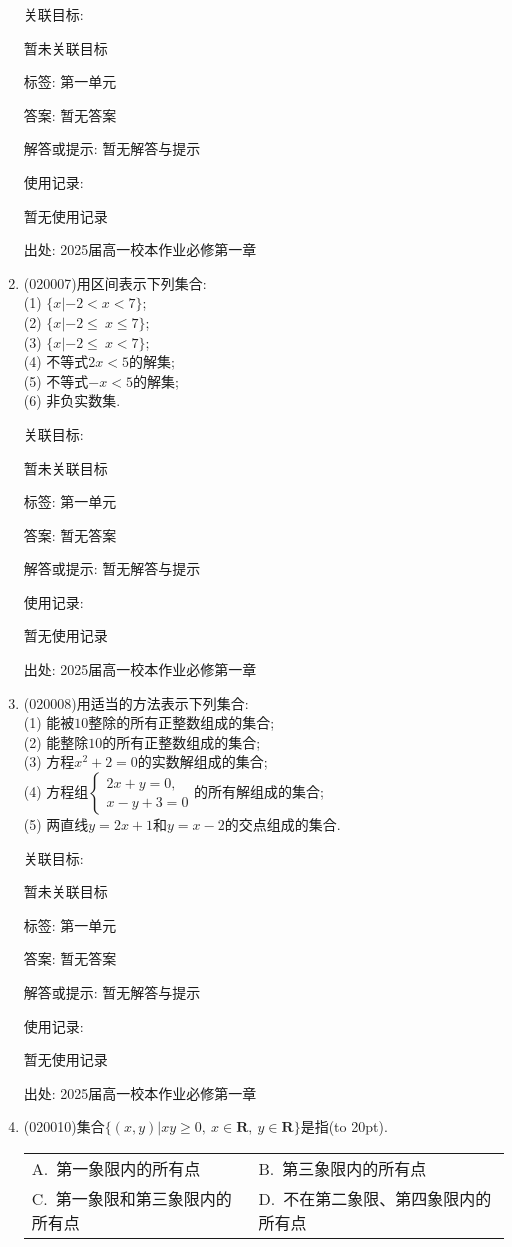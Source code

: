 \documentclass[10pt,a4paper]{article}
\newcommand{\bracket}[1]{(\hbox to #1pt{})}
\newcommand{\twoch}[4]{\par\begin{tabular}{p{.46\textwidth}p{.46\textwidth}}
A.~#1& B.~#2\\
C.~#3& D.~#4
\end{tabular}}
\begin{document}
\begin{enumerate}[1.]
关联目标:

暂未关联目标



标签: 第一单元

答案: 暂无答案

解答或提示: 暂无解答与提示

使用记录:

暂无使用记录


出处: 2025届高一校本作业必修第一章
\item { (020007)}用区间表示下列集合:\\
(1) $\{x|-2<x<7\}$;\\
(2) $\{x|-2\le\ x\le7\}$;\\
(3) $\{x|-2\le\ x<7\}$;\\
(4) 不等式$2x<5$的解集;\\
(5) 不等式$-x<5$的解集; \\
(6) 非负实数集.


关联目标:

暂未关联目标



标签: 第一单元

答案: 暂无答案

解答或提示: 暂无解答与提示

使用记录:

暂无使用记录


出处: 2025届高一校本作业必修第一章
\item { (020008)}用适当的方法表示下列集合:\\
(1) 能被$10$整除的所有正整数组成的集合;\\
(2) 能整除$10$的所有正整数组成的集合;\\
(3) 方程$x^2+2=0$的实数解组成的集合;\\
(4) 方程组$\begin{cases}2x+y=0, \\ x-y+3=0\end{cases}$的所有解组成的集合;\\
(5) 两直线$y=2x+1$和$y=x-2$的交点组成的集合.


关联目标:

暂未关联目标



标签: 第一单元

答案: 暂无答案

解答或提示: 暂无解答与提示

使用记录:

暂无使用记录


出处: 2025届高一校本作业必修第一章
\item { (020010)}集合$\{(x, y)|xy\ge 0,\  x\in\mathbf{R},\  y\in\mathbf{R}\}$是指\bracket{20}.
\twoch{第一象限内的所有点}{第三象限内的所有点}{第一象限和第三象限内的所有点}{不在第二象限、第四象限内的所有点}



\end{enumerate}
\end{document}
